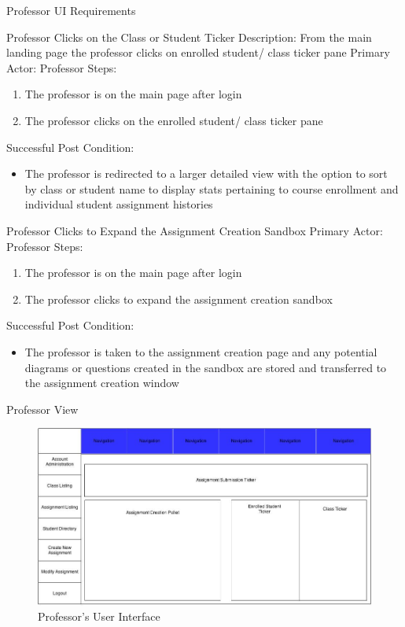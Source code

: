 \documentclass{article}
\begin{document}
\begin{section}{Professor UI Requirements}
\begin{subsection}{Professor Clicks on the Class or Student Ticker}
Description: From the main landing page the professor clicks on enrolled student/ class ticker pane \newline
Primary Actor: Professor \newline
Steps:
\begin{enumerate}
\item{The professor is on the main page after login}
\item{The professor clicks on the enrolled student/ class ticker pane}
\end{enumerate}
Successful Post Condition:
\begin{itemize}
\item The professor is redirected to a larger detailed view with the option to sort by class or student name to display stats pertaining to course enrollment and individual student assignment histories
\end{itemize}
\end{subsection}

\begin{subsection}{Professor Clicks to Expand the Assignment Creation Sandbox}
Primary Actor: Professor \newline
Steps:
\begin{enumerate}
\item{The professor is on the main page after login} 
\item{The professor clicks to expand the assignment creation sandbox}
\end{enumerate}
Successful Post Condition:
\begin{itemize}
\item{The professor is taken to the assignment creation page and any potential diagrams or questions created in the sandbox are stored and transferred to the assignment creation window}
\end{itemize}
\end{subsection}

\newpage

\begin{subsection}{Professor View}
\begin{figure}[h!]
        \centerline{\includegraphics[width=17cm]{ProfessorView.jpg}}
        \caption{Professor's User Interface}
\end{figure}
\end{subsection}
\newpage


\end{section}
\end{document}
